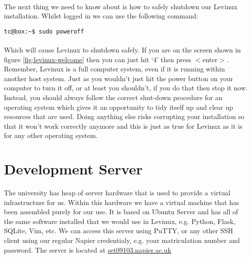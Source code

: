 \documentclass[12pt, a4paper, twoside]{book}
\begin{document}

\paragraph{} The next thing we need to know about is how to safely shutdown our Levinux installation. Whilst logged in we can use the following command:
\begin{lstlisting}[style=DOS]
    tc@box:~$ sudo poweroff
\end{lstlisting}
\paragraph{} Which will cause Levinux to shutdown safely. If you are on the screen shown in figure \ref{fig:levinux-welcome} then you can just hit `4' then press $<$enter$>$. Remember, Levinux is a full computer system, even if it is running within another host system. Just as you wouldn't just hit the power button on your computer to turn it off, or at least you shouldn't, if you do that then stop it now. Instead, you should always follow the correct shut-down procedure for an operating system which gives it an opportunity to tidy itself up and clear up resources that are used. Doing anything else risks corrupting your installation so that it won't work correctly anymore and this is just as true for Levinux as it is for any other operating system.

\section{Development Server}
\label{devserver}
\paragraph{} The university has heap of server hardware that is used to provide a virtual infrastructure for us. Within this hardware we have a virtual machine that has been assembled purely for our use. It is based on Ubuntu Server and has all of the same software installed that we would use in Levinux, e.g. Python, Flask, SQLite, Vim, etc. We can access this server using PuTTY, or any other SSH client using our regular Napier credentialy, e.g. your matriculation number and password. The server is located at \url{set09103.napier.ac.uk}
\end{document}
